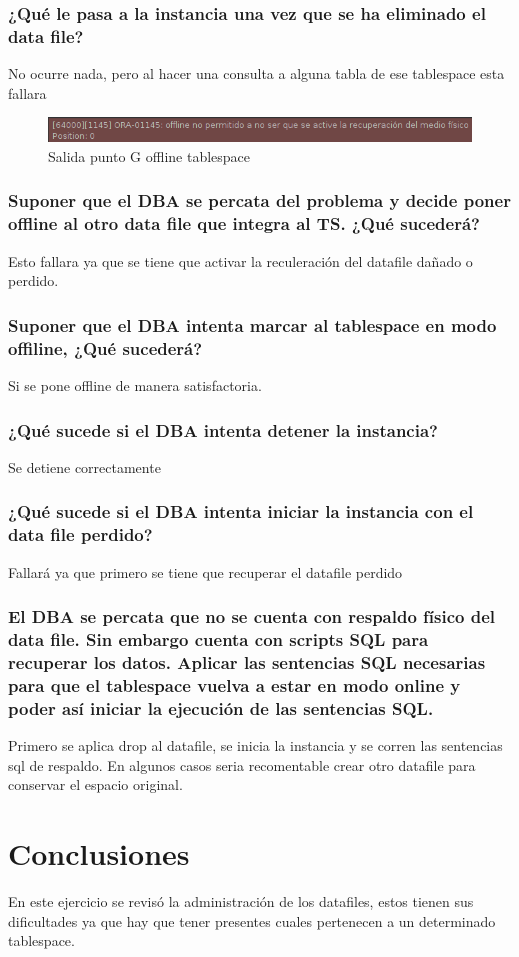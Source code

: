 \documentclass[journal]{IEEEtran}
\begin{document}
\subsubsection{¿Qué le pasa a la instancia una vez que se ha eliminado el data file?}
No ocurre nada, pero al hacer una consulta a alguna tabla de ese tablespace esta fallara
\begin{figure}[H]
  \centering
  \includegraphics[scale=.35]{captura_g-2.png}
   \caption{Salida punto G offline tablespace}
   \label{fig:validador_5}
\end{figure}
\subsubsection{Suponer que el DBA se percata del problema y decide poner offline al otro data file que integra al TS. ¿Qué sucederá?}
Esto fallara ya que se tiene que activar la reculeración del datafile dañado o perdido.
\subsubsection{Suponer que el DBA intenta marcar al tablespace en modo offiline, ¿Qué sucederá?}
Si se pone offline de manera satisfactoria.
\subsubsection{¿Qué sucede si el DBA intenta detener la instancia?}
Se detiene correctamente
\subsubsection{¿Qué sucede si el DBA intenta iniciar la instancia con el data file perdido?}
Fallará ya que primero se tiene que recuperar el datafile perdido
\subsubsection{El DBA se percata que no se cuenta con respaldo físico del data file. Sin embargo cuenta con scripts SQL para recuperar los datos. Aplicar las
sentencias SQL necesarias para que el tablespace vuelva a estar en modo online y poder así iniciar la ejecución de las sentencias SQL.}
Primero se aplica drop al datafile, se inicia la instancia y se corren las sentencias sql de respaldo.
En algunos casos seria recomentable crear otro datafile para conservar el espacio original.
\section{Conclusiones}
En este ejercicio se revisó la administración de los datafiles, estos tienen sus dificultades ya 
que hay que tener presentes cuales pertenecen a un determinado tablespace.
\ifCLASSOPTIONcaptionsoff
  \newpage

\fi
\end{document}
